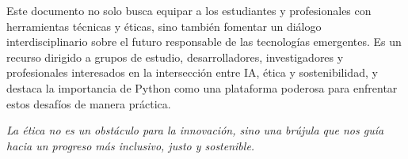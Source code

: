 Este documento no solo busca equipar a los estudiantes y profesionales con herramientas técnicas y éticas, sino también fomentar un diálogo interdisciplinario sobre el futuro responsable de las tecnologías emergentes. Es un recurso dirigido a grupos de estudio, desarrolladores, investigadores y profesionales interesados en la intersección entre IA, ética y sostenibilidad, y destaca la importancia de Python como una plataforma poderosa para enfrentar estos desafíos de manera práctica.

\emph{La ética no es un obstáculo para la innovación, sino una brújula que nos guía hacia un progreso más inclusivo, justo y sostenible.}
